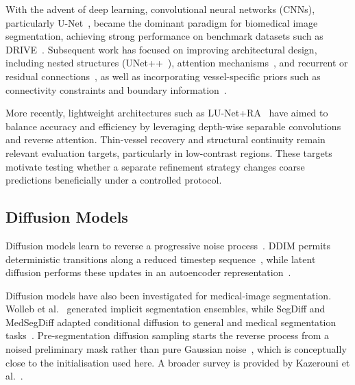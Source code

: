 \documentclass[jimaging,article,submit,pdftex,moreauthors]
  {Definitions/mdpi}
\begin{document}
With the advent of deep learning, convolutional neural networks (CNNs), particularly U-Net~\cite{Ronneberger2015}, became the dominant paradigm for biomedical image segmentation, achieving strong performance on benchmark datasets such as DRIVE~\cite{Staal2004}. Subsequent work has focused on improving architectural design, including nested structures (UNet++~\cite{Zhou2018UNetpp}), attention mechanisms~\cite{Oktay2018AttUNet, Schlemper2019AG}, and recurrent or residual connections~\cite{Alom2018R2UNet}, as well as incorporating vessel-specific priors such as connectivity constraints and boundary information~\cite{Fu2016DeepVessel, Liskowski2016, Shin2019Connectivity}.

More recently, lightweight architectures such as LU-Net+RA~\cite{Hernandez2025} have aimed to balance accuracy and efficiency by leveraging depth-wise separable convolutions and reverse attention. Thin-vessel recovery and structural continuity remain relevant evaluation targets, particularly in low-contrast regions. These targets motivate testing whether a separate refinement strategy changes coarse predictions beneficially under a controlled protocol.

\subsection{Diffusion Models}

Diffusion models learn to reverse a progressive noise process~\cite{Ho2020}. DDIM permits deterministic transitions along a reduced timestep sequence~\cite{Song2021}, while latent diffusion performs these updates in an autoencoder representation~\cite{Rombach2022}.

Diffusion models have also been investigated for medical-image segmentation. Wolleb et al.~\cite{Wolleb2022} generated implicit segmentation ensembles, while SegDiff and MedSegDiff adapted conditional diffusion to general and medical segmentation tasks~\cite{SegDiff,MedSegDiff}. Pre-segmentation diffusion sampling starts the reverse process from a noised preliminary mask rather than pure Gaussian noise~\cite{PDDiffusion}, which is conceptually close to the initialisation used here. A broader survey is provided by Kazerouni et al.~\cite{Kazerouni2023}.
\end{document}
